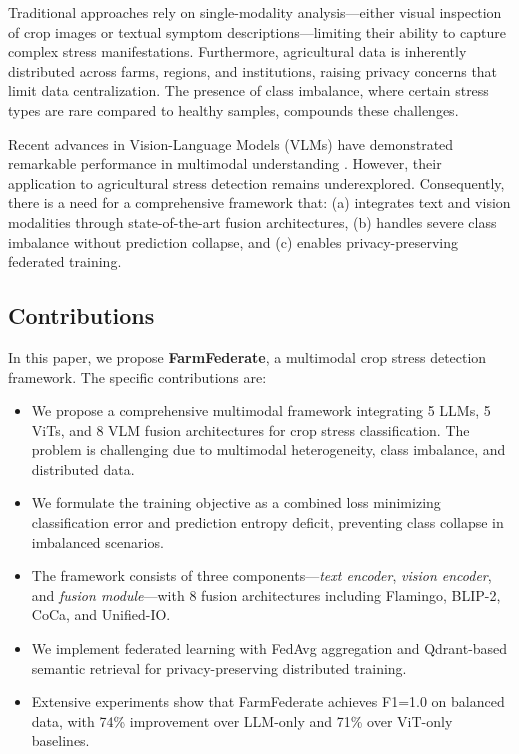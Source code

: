 \documentclass[journal]{IEEEtran}
\begin{document}
Traditional approaches rely on single-modality analysis---either visual inspection of crop images or textual symptom descriptions---limiting their ability to capture complex stress manifestations. Furthermore, agricultural data is inherently distributed across farms, regions, and institutions, raising privacy concerns that limit data centralization. The presence of class imbalance, where certain stress types are rare compared to healthy samples, compounds these challenges.

Recent advances in Vision-Language Models (VLMs) have demonstrated remarkable performance in multimodal understanding \cite{clip2021, blip2_2023, flamingo2022}. However, their application to agricultural stress detection remains underexplored. Consequently, there is a need for a comprehensive framework that: (a) integrates text and vision modalities through state-of-the-art fusion architectures, (b) handles severe class imbalance without prediction collapse, and (c) enables privacy-preserving federated training.

\subsection{Contributions}

In this paper, we propose \textbf{FarmFederate}, a multimodal crop stress detection framework. The specific contributions are:

\begin{itemize}
    \item We propose a comprehensive multimodal framework integrating 5 LLMs, 5 ViTs, and 8 VLM fusion architectures for crop stress classification. The problem is challenging due to multimodal heterogeneity, class imbalance, and distributed data.

    \item We formulate the training objective as a combined loss minimizing classification error and prediction entropy deficit, preventing class collapse in imbalanced scenarios.

    \item The framework consists of three components---\textit{text encoder}, \textit{vision encoder}, and \textit{fusion module}---with 8 fusion architectures including Flamingo, BLIP-2, CoCa, and Unified-IO.

    \item We implement federated learning with FedAvg aggregation and Qdrant-based semantic retrieval for privacy-preserving distributed training.

    \item Extensive experiments show that FarmFederate achieves F1=1.0 on balanced data, with 74\% improvement over LLM-only and 71\% over ViT-only baselines.
\end{itemize}
\end{document}
